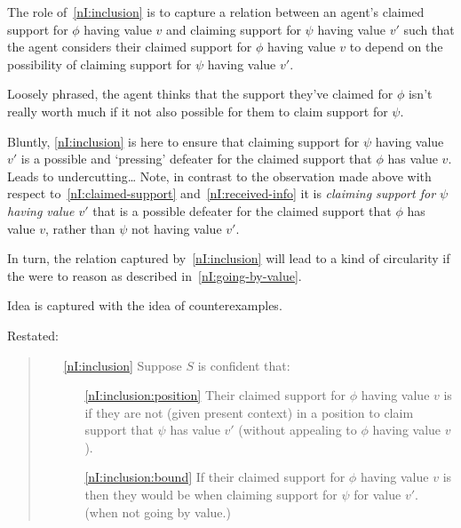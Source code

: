 \begin{note}
  The role of~\ref{nI:inclusion} is to capture a relation between an agent's claimed support for \(\phi\) having value \(v\) and claiming support for \(\psi\) having value \(v'\) such that the agent considers their claimed support for \(\phi\) having value \(v\) to depend on the possibility of claiming support for \(\psi\) having value \(v'\).

  Loosely phrased, the agent thinks that the support they've claimed for \(\phi\) isn't really worth much if it not also possible for them to claim support for \(\psi\).

  Bluntly, \ref{nI:inclusion} is here to ensure that claiming support for \(\psi\) having value \(v'\) is a possible and `pressing' defeater for the claimed support that \(\phi\) has value \(v\).
  {
    \color{red} Leads to undercutting\dots
  }
  Note, in contrast to the observation made above with respect to~\ref{nI:claimed-support} and~\ref{nI:received-info} it is \emph{claiming support for \(\psi\) having value \(v'\)} that is a possible defeater for the claimed support that \(\phi\) has value \(v\), rather than \(\psi\) not having value \(v'\).

  In turn, the relation captured by~\ref{nI:inclusion} will lead to a kind of circularity if the were to reason as described in~\ref{nI:going-by-value}.
\end{note}

\begin{note}[Example]
  Idea is captured with the idea of counterexamples.
\end{note}

\begin{note}[\ref{nI:inclusion}]
  Restated:
  \begin{quote}
    \color{blue}
    \begin{enumerate}
    \item[\ref{nI:inclusion}]
      Suppose \(S\) is confident that:
      \begin{enumerate}
      \item[\ref{nI:inclusion:position}] Their claimed support for \(\phi\) having value \(v\) is \mom{} if they are not (given present context) in a position to claim support that \(\psi\) has value \(v'\) (without appealing to \(\phi\) having value \(v\)).
      \item[\ref{nI:inclusion:bound}] If their claimed support for \(\phi\) having value \(v\) is \nmom{} then they would be \nmom{} when claiming support for \(\psi\) for value \(v'\). (when not going by value.)
      \end{enumerate}
    \end{enumerate}
  \end{quote}
\end{note}

